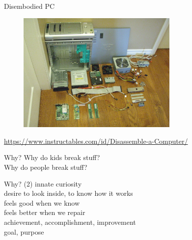 \documentclass{simple}
\begin{document}
\begin{frame}{Disembodied PC}
  \begin{figure}
    \centering
    \includegraphics[width=0.7\textwidth]{img/disassembled-pc}
  \end{figure}
  \begin{center}
    \tiny
    \url{https://www.instructables.com/id/Disassemble-a-Computer/}
  \end{center}
\end{frame}

\begin{frame}{Why?}
  \centering
  \pause \Large{Why do kids break stuff?} \\
  \vspace{0.5cm}
  \pause \Large{Why do people break stuff?}
  \vspace{0.5cm}
\end{frame}

\begin{frame}{Why? (2)}
  \centering
  \pause \Large{innate curiosity} \\
  \vspace{0.5cm}
  \pause \Large{desire to look inside, to know how it works} \\
  \vspace{0.5cm}
  \pause \Large{feels good when we know} \\
  \vspace{0.5cm}
  \pause \Large{feels better when we repair} \\
  \vspace{0.5cm}
  \pause \Large{achievement, accomplishment, improvement} \\
  \vspace{0.5cm}
  \pause \Large{goal, purpose}
\end{frame}
\end{document}
